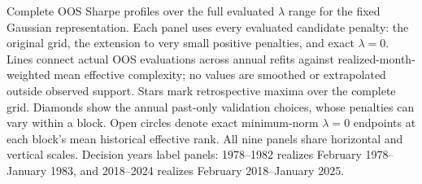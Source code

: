 \caption{Complete OOS Sharpe profiles over the full evaluated $\lambda$
range for the fixed Gaussian representation. Each panel uses every evaluated
candidate penalty: the original grid, the extension to very small positive
penalties, and exact $\lambda=0$. Lines connect actual OOS evaluations across
annual refits against realized-month-weighted mean effective complexity;
no values are smoothed or extrapolated outside observed support. Stars mark
retrospective maxima over the complete grid. Diamonds show the annual
past-only validation choices, whose penalties can vary within a block. Open
circles denote exact minimum-norm $\lambda=0$ endpoints at each block's mean
historical effective rank. All nine panels share horizontal and vertical
scales. Decision years label panels: 1978--1982 realizes February 1978--January
1983, and 2018--2024 realizes February 2018--January 2025.}
\label{fig:complexity_nine}
